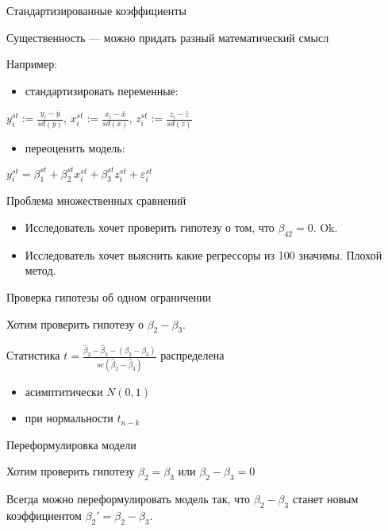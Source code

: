 \documentclass[russian,ignorenonframetext,]{beamer}
\providecommand{\tightlist}{%
  \setlength{\itemsep}{0pt}\setlength{\parskip}{0pt}}
\begin{document}
\begin{frame}{Стандартизированные коэффициенты}

Существенность --- можно придать разный математический смысл

Например:

\begin{itemize}
\tightlist
\item
  стандартизировать переменные:
\end{itemize}

\(y^{st}_i:= \frac{y_i-\bar{y}}{sd(y)}\),
\(x^{st}_i:= \frac{x_i-\bar{x}}{sd(x)}\),
\(z^{st}_i:= \frac{z_i-\bar{z}}{sd(z)}\)

\begin{itemize}
\tightlist
\item
  переоценить модель:
\end{itemize}

\(y^{st}_i=\beta_1^{st}+\beta_2^{st}x_i^{st}+\beta_3^{st}z_i^{st}+\varepsilon_i^{st}\)

\end{frame}

\begin{frame}{Проблема множественных сравнений}

\begin{itemize}
\item
  Исследователь хочет проверить гипотезу о том, что \(\beta_{42}=0\).
  Ok.
\item
  Исследователь хочет выяснить какие регрессоры из 100 значимы. Плохой
  метод.
\end{itemize}

\end{frame}

\begin{frame}{Проверка гипотезы об одном ограничении}

Хотим проверить гипотезу о \(\beta_2-\beta_3\).

Статистика
\(t=\frac{\hat{\beta}_2-\hat{\beta}_3-(\beta_2-\beta_3)}{se(\hat{\beta}_2-\hat{\beta}_3)}\)
распределена

\begin{itemize}
\item
  асимптитически \(N(0,1)\)
\item
  при нормальности \(t_{n-k}\)
\end{itemize}

\end{frame}

\begin{frame}{Переформулировка модели}

Хотим проверить гипотезу \(\beta_2=\beta_3\) или \(\beta_2-\beta_3=0\)

Всегда можно переформулировать модель так, что \(\beta_2-\beta_3\)
станет новым коэффициентом \(\beta_2'=\beta_2-\beta_3\).

\end{frame}
\end{document}

